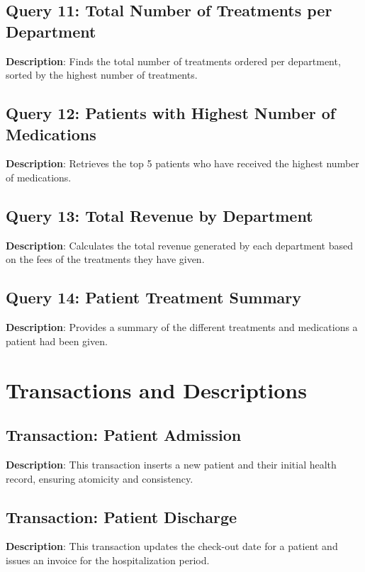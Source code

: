 \documentclass[a4paper,11pt]{article}
\theoremstyle{mytheor}
\begin{document}
\subsection{Query 11: Total Number of Treatments per Department}

\textbf{Description}: Finds the total number of treatments ordered per department, sorted by the highest number of treatments.

\subsection{Query 12: Patients with Highest Number of Medications}

\textbf{Description}: Retrieves the top 5 patients who have received the highest number of medications.

\subsection{Query 13: Total Revenue by Department}

\textbf{Description}: Calculates the total revenue generated by each department based on the fees of the treatments they have given.

\subsection{Query 14: Patient Treatment Summary}

\textbf{Description}: Provides a summary of the different treatments and medications a patient had been given.


\section{Transactions and Descriptions}
\subsection{Transaction: Patient Admission}

\textbf{Description}: This transaction inserts a new patient and their initial health record, ensuring atomicity and consistency.

\subsection{Transaction: Patient Discharge}

\textbf{Description}: This transaction updates the check-out date for a patient and issues an invoice for the hospitalization period.
\end{document}
